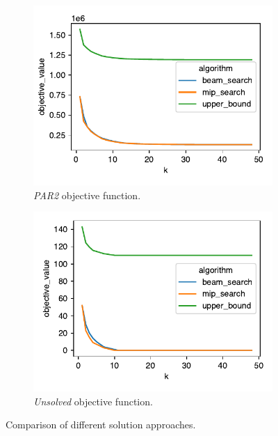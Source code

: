 \documentclass[conference]{IEEEtran}
\begin{document}
\begin{figure}[htb]
	\centering
	\begin{subfigure}{0.98\columnwidth}
		\centering
		\includegraphics[width=\columnwidth]{plots/objective-PAR2.pdf}
		\caption{\emph{PAR2} objective function.}
		\label{fig:objective-PAR2}
	\end{subfigure}
	\hfill
	\begin{subfigure}{0.98\columnwidth}
		\centering
		\includegraphics[width=\columnwidth]{plots/objective-solved.pdf}
		\caption{\emph{Unsolved} objective function.}
		\label{fig:objective-unsolved}
	\end{subfigure}
	\caption{Comparison of different solution approaches.}
	\label{fig:objective}
\end{figure}
\end{document}
